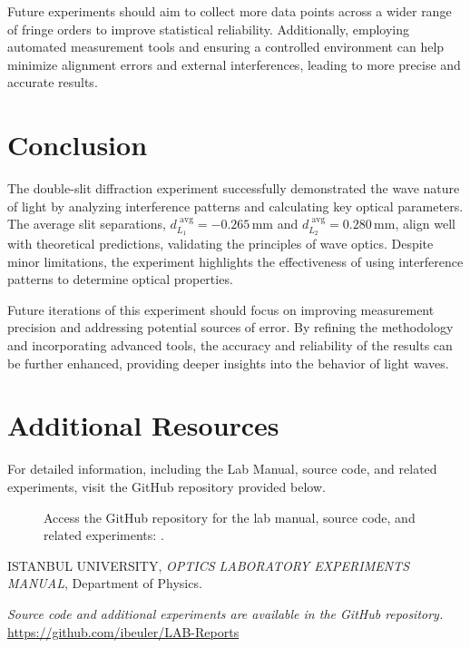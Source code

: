 \documentclass[journal]{IEEEtran}
\begin{document}
        Future experiments should aim to collect more data points across a wider range of fringe orders to improve statistical reliability. Additionally, employing automated measurement tools and ensuring a controlled environment can help minimize alignment errors and external interferences, leading to more precise and accurate results.

\section{Conclusion}
The double-slit diffraction experiment successfully demonstrated the wave nature of light by analyzing interference patterns and calculating key optical parameters. The average slit separations, \( d_{L_1}^{\text{ avg}} = -0.265 \, \text{mm} \) and \( d_{L_2}^{\text{ avg}} = 0.280 \, \text{mm} \), align well with theoretical predictions, validating the principles of wave optics. Despite minor limitations, the experiment highlights the effectiveness of using interference patterns to determine optical properties.

Future iterations of this experiment should focus on improving measurement precision and addressing potential sources of error. By refining the methodology and incorporating advanced tools, the accuracy and reliability of the results can be further enhanced, providing deeper insights into the behavior of light waves.

\section{Additional Resources}
For detailed information, including the Lab Manual, source code, and related experiments, visit the GitHub repository provided below.

\begin{figure}[H]
    \centering
    \begin{minipage}{0.15\textwidth}
        \centering
    \end{minipage}%
    \begin{minipage}{0.2\textwidth}
        \raggedright
        \caption{Access the GitHub repository for the lab manual, source code, and related experiments: \cite{github}.}
        \label{fig:qr_code}
    \end{minipage}
\end{figure}

\begin{thebibliography}{9}
    ISTANBUL UNIVERSITY, \textit{OPTICS LABORATORY
    EXPERIMENTS MANUAL}, Department of Physics.

    \textit{Source code and additional experiments are available in the GitHub repository.} \url{https://github.com/ibeuler/LAB-Reports}
\end{thebibliography}
\end{document}
